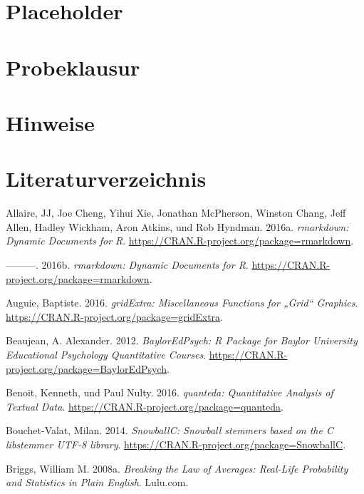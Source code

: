 \documentclass[12pt,ngerman,]{book}
\theoremstyle{definition}
\theoremstyle{definition}
\theoremstyle{remark}
\begin{document}
\chapter{Placeholder}\label{placeholder-1}

\chapter{Probeklausur}\label{probeklausur}

\chapter{Hinweise}\label{hinweise-1}

\chapter{Literaturverzeichnis}\label{literaturverzeichnis}

\hypertarget{refs}{}
\hypertarget{ref-R-rmarkdown}{}
Allaire, JJ, Joe Cheng, Yihui Xie, Jonathan McPherson, Winston Chang,
Jeff Allen, Hadley Wickham, Aron Atkins, und Rob Hyndman. 2016a.
\emph{rmarkdown: Dynamic Documents for R}.
\url{https://CRAN.R-project.org/package=rmarkdown}.

\hypertarget{ref-rmarkdown}{}
---------. 2016b. \emph{rmarkdown: Dynamic Documents for R}.
\url{https://CRAN.R-project.org/package=rmarkdown}.

\hypertarget{ref-R-gridExtra}{}
Auguie, Baptiste. 2016. \emph{gridExtra: Miscellaneous Functions for
„Grid`` Graphics}. \url{https://CRAN.R-project.org/package=gridExtra}.

\hypertarget{ref-R-BaylorEdPsych}{}
Beaujean, A. Alexander. 2012. \emph{BaylorEdPsych: R Package for Baylor
University Educational Psychology Quantitative Courses}.
\url{https://CRAN.R-project.org/package=BaylorEdPsych}.

\hypertarget{ref-R-quanteda}{}
Benoit, Kenneth, und Paul Nulty. 2016. \emph{quanteda: Quantitative
Analysis of Textual Data}.
\url{https://CRAN.R-project.org/package=quanteda}.

\hypertarget{ref-R-SnowballC}{}
Bouchet-Valat, Milan. 2014. \emph{SnowballC: Snowball stemmers based on
the C libstemmer UTF-8 library}.
\url{https://CRAN.R-project.org/package=SnowballC}.

\hypertarget{ref-breaking}{}
Briggs, William M. 2008a. \emph{Breaking the Law of Averages: Real-Life
Probability and Statistics in Plain English}. Lulu.com.
\end{document}
